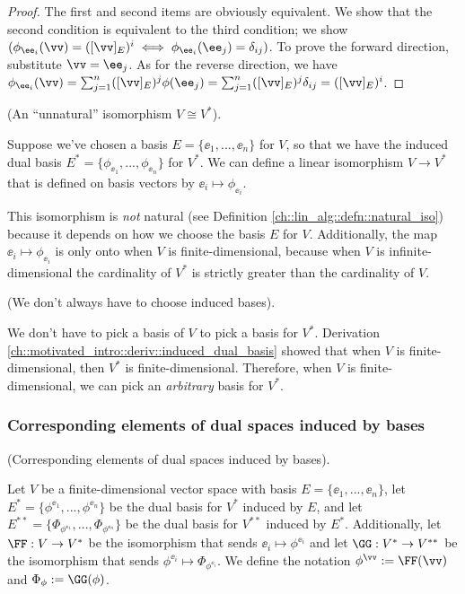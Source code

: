 \begin{proof}
    The first and second items are obviously equivalent. We show that the second condition is equivalent to the third condition; we show $(\phi_{\ee_i}(\vv) = ([\vv]_E)^i \iff \phi_{\ee_i}(\ee_j) = \delta_{ij})$. To prove the forward direction, substitute $\vv = \ee_j$. As for the reverse direction, we have $\phi_{\ee_i}(\vv) = \sum_{j = 1}^n ([\vv]_E)^j \phi(\ee_j) = \sum_{j = 1}^n ([\vv]_E)^j \delta_{ij} = ([\vv]_E)^i$.
\end{proof}

\begin{remark}
\label{ch::motivated_intro::rmk::unnatural_iso_V_V*}
    (An ``unnatural'' isomorphism $V \cong V^*$).
    
    Suppose we've chosen a basis $E = \{\ee_1, ..., \ee_n\}$ for $V$, so that we have the induced dual basis $E^* = \{\phi_{\ee_1}, ..., \phi_{\ee_n}\}$ for $V^*$. We can define a linear isomorphism $V \rightarrow V^*$ that is defined on basis vectors by $\ee_i \mapsto \phi_{\ee_i}$.
    
    This isomorphism is \textit{not} natural (see Definition \ref{ch::lin_alg::defn::natural_iso}) because it depends on how we choose the basis $E$ for $V$. Additionally, the map $\ee_i \mapsto \phi_{\ee_i}$ is only onto when $V$ is finite-dimensional, because when $V$ is infinite-dimensional the cardinality of $V^*$ is strictly greater than the cardinality of $V$.
\end{remark}

\begin{remark}
    (We don't always have to choose induced bases).
    
    We don't have to pick a basis of $V$ to pick a basis for $V^*$. Derivation \ref{ch::motivated_intro::deriv::induced_dual_basis} showed that when $V$ is finite-dimensional, then $V^*$ is finite-dimensional. Therefore, when $V$ is finite-dimensional, we can pick an \textit{arbitrary} basis for $V^*$.
\end{remark}

\subsubsection*{Corresponding elements of dual spaces induced by bases}

\begin{defn}
    (Corresponding elements of dual spaces induced by bases).
    
    Let $V$ be a finite-dimensional vector space with basis $E = \{\ee_1, ..., \ee_n\}$, let $E^* = \{\phi^{\ee_1}, ..., \phi^{\ee_n}\}$ be the dual basis for $V^*$ induced by $E$, and let $E^{**} = \{\Phi_{\phi^{\ee_1}}, ..., \Phi_{\phi^{\ee_n}}\}$ be the dual basis for $V^{**}$ induced by $E^*$. Additionally, let $\FF:V \rightarrow V^*$ be the isomorphism that sends $\ee_i \mapsto \phi^{\ee_i}$ and let $\GG:V^* \rightarrow V^{**}$ be the isomorphism that sends $\phi^{\ee_i} \mapsto \Phi_{\phi^{\ee_i}}$. We define the notation $\phi^\vv := \FF(\vv)$ and $\Phi_\phi := \GG(\phi)$.
\end{defn}

